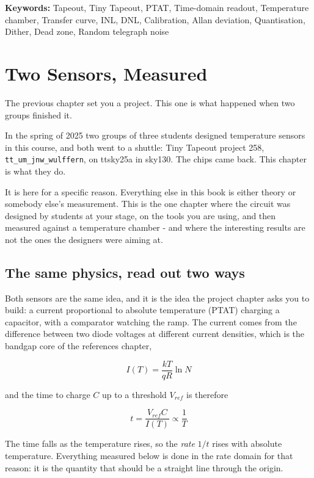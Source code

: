 \textbf{Keywords:} Tapeout, Tiny Tapeout, PTAT, Time-domain readout,
Temperature chamber, Transfer curve, INL, DNL, Calibration, Allan
deviation, Quantisation, Dither, Dead zone, Random telegraph noise

\section{Two Sensors, Measured}\label{two-sensors-measured}

The previous chapter set you a project. This one is what happened when
two groups finished it.

In the spring of 2025 two groups of three students designed temperature
sensors in this course, and both went to a shuttle: Tiny Tapeout project
258, \texttt{tt\_um\_jnw\_wulffern}, on ttsky25a in sky130. The chips
came back. This chapter is what they do.

It is here for a specific reason. Everything else in this book is either
theory or somebody else's measurement. This is the one chapter where the
circuit was designed by students at your stage, on the tools you are
using, and then measured against a temperature chamber - and where the
interesting results are not the ones the designers were aiming at.

\subsection{The same physics, read out two
ways}\label{the-same-physics-read-out-two-ways}

Both sensors are the same idea, and it is the idea the project chapter
asks you to build: a current proportional to absolute temperature (PTAT)
charging a capacitor, with a comparator watching the ramp. The current
comes from the difference between two diode voltages at different
current densities, which is the bandgap core of the references chapter,

\[I(T) = \frac{kT}{qR}\ln N\]

and the time to charge \(C\) up to a threshold \(V_{ref}\) is therefore

\[t = \frac{V_{ref}C}{I(T)} \propto \frac{1}{T}\]

The time falls as the temperature rises, so the \emph{rate} \(1/t\)
rises with absolute temperature. Everything measured below is done in
the rate domain for that reason: it is the quantity that should be a
straight line through the origin.

